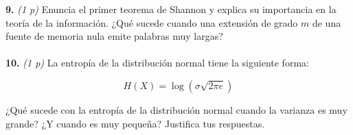 \documentclass{article}
\begin{document}
\textbf{9.} \textit{(1 p)} Enuncia el primer teorema de Shannon y explica su importancia en la teoría de la información. ¿Qué sucede cuando una extensión de grado \(m\) de una fuente de memoria nula emite palabras muy largas?\\\\

\textbf{10.} \textit{(1 p)} La entropía de la distribución normal tiene la siguiente forma:

\[
H(X) = \log(\sigma\sqrt{2\pi e
})
\]

¿Qué sucede con la entropía de la distribución normal cuando la varianza es muy grande? ¿Y cuando es muy pequeña? Justifica tus respuestas.
\end{document}
